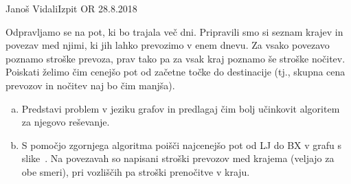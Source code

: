 \begin{naloga}{Janoš Vidali}{Izpit OR 28.8.2018}
\begin{vprasanje}
Odpravljamo se na pot, ki bo trajala več dni.
Pripravili smo si seznam krajev in povezav med njimi,
ki jih lahko prevozimo v enem dnevu.
Za vsako povezavo poznamo stroške prevoza,
prav tako pa za vsak kraj poznamo še stroške nočitev.
Poiskati želimo čim cenejšo pot od začetne točke do destinacije
(tj., skupna cena prevozov in nočitev naj bo čim manjša).

\begin{enumerate}[(a)]
\item Predstavi problem v jeziku grafov
in predlagaj čim bolj učinkovit algoritem za njegovo reševanje.

\item S pomočjo zgornjega algoritma poišči najcenejšo pot od LJ do BX
v grafu s slike~.
Na povezavah so napisani stroški prevozov med krajema
(veljajo za obe smeri),
pri vozliščih pa stroški prenočitve v kraju.
\end{enumerate}
\end{vprasanje}
\begin{odgovor}
\end{odgovor}
\end{naloga}
